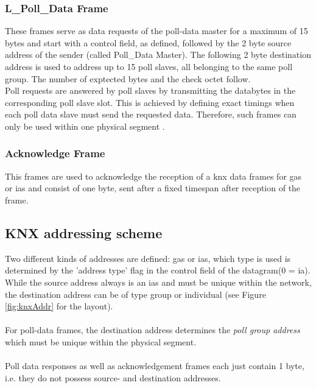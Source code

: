 \subsubsection{L\_Poll\_Data Frame}\label{sec:pollDataFrame}

These frames serve as data requests of the poll-data master for a maximum of 15 bytes
and start with a control field, as defined, followed by the 2 byte source address
of the sender (called Poll\_Data Master). The following 2 byte destination address is 
used to address up to 15 poll slaves, all belonging to the same poll group. The number of
exptected bytes and the check octet follow.
\\
Poll requests are answered by poll slaves by transmitting the databytes in the corresponding poll slave slot.
This is achieved by defining exact timings when each poll data slave must send the requested data. Therefore, such frames can only be used within
one physical segment \cite{knxTP1}.

\subsubsection{Acknowledge Frame}\label{sec:ackFrame}

This frames are used to acknowledge the reception of a \gls{knx} data frames for \glspl{ga} or \glspl{ia} and consist
of one byte, sent after a fixed timespan after reception of the frame.

\subsection{KNX addressing scheme}

Two different kinds of addresses are defined: \glspl{ga} or \glspl{ia}, which type is used is determined by the 'address type' flag in the
control field of the datagram(0 = \gls{ia}). While the source address always is an \glspl{ia} and must be unique
within the network, the destination address can be of type group or individual (see Figure \ref{fig:knxAddr} for the layout).
\\
\\
For poll-data frames, the destination address determines the \textit{poll group address} which must be unique within the physical segment.
\\
\\
Poll data responses as well as acknowledgement frames each just contain 1 byte, i.e. they do not possess source- and destination addresses.

